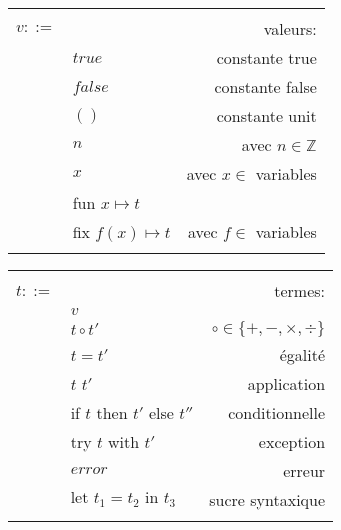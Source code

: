 \documentclass[11pt, a4paper, notitlepage]{article}
\begin{document}
\begin{center}
   \begin{tabular}{|llr|}
      \hline
      & &\\
      $v ::=$ & & valeurs:\\
      & $true$ & constante true\\
      & $false$ & constante false\\
      & $()$ & constante unit\\
      & $n$ & avec $n \in \mathbb{Z}$\\
      & $x$ & avec $x \in$ variables\\
      & fun $x \mapsto t$ &\\
      & fix $f(x) \mapsto t$ & avec $f \in$ variables\\
      & &\\
      \hline
   \end{tabular}
   \begin{tabular}{|llr|}
      \hline
      & &\\
      $t ::=$ & & termes:\\
      & $v$ &\\
      & $t \circ t'$ & $\circ \in \{+, -, \times, \div\}$\\
      & $t = t'$ & égalité\\
      & $t$ $t'$ & application\\
      & if $t$ then $t'$ else $t''$ & conditionnelle\\
      & try $t$ with $t'$ & exception\\
      & $error$ & erreur\\
      & $\text{let }t_1 = t_2 \text{ in } t_3$ & sucre syntaxique\\
      & &\\
      \hline
   \end{tabular}
\end{center}
\end{document}
